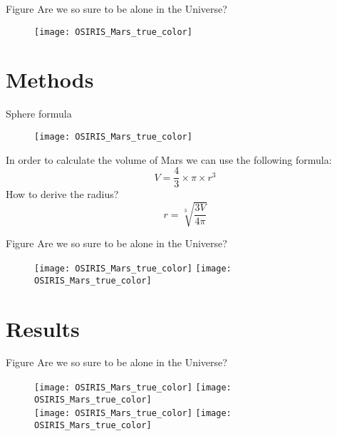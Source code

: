 \documentclass{beamer}
\begin{document}
\begin{frame}{Figure}
Are we so sure to be alone in the Universe?
    \begin{figure}
        \centering
        \texttt{[image: OSIRIS\_Mars\_true\_color]}
    \end{figure}
\end{frame}

\section{Methods}

\begin{frame}{Sphere formula}
   \begin{figure}
        \centering
        \texttt{[image: OSIRIS\_Mars\_true\_color]}
    \end{figure}
    In order to calculate the volume of Mars we can use the following formula:
    \begin{equation}
        V=\frac{4}{3} \times \pi \times r^3
    \end{equation}
    How to derive the radius?
    \begin{equation}
        r=\sqrt[3]{\frac{3V}{4\pi}}
    \end{equation}
\end{frame}

\begin{frame}{Figure}
Are we so sure to be alone in the Universe?
    \begin{figure}
        \centering
        \texttt{[image: OSIRIS\_Mars\_true\_color]}
        \texttt{[image: OSIRIS\_Mars\_true\_color]}
    \end{figure}
\end{frame}

\section{Results}

\begin{frame}{Figure}
Are we so sure to be alone in the Universe?
    \begin{figure}
        \centering
        \texttt{[image: OSIRIS\_Mars\_true\_color]}
        \texttt{[image: OSIRIS\_Mars\_true\_color]} \\
        \texttt{[image: OSIRIS\_Mars\_true\_color]}
        \texttt{[image: OSIRIS\_Mars\_true\_color]}        
    \end{figure}
\end{frame}
\end{document}

